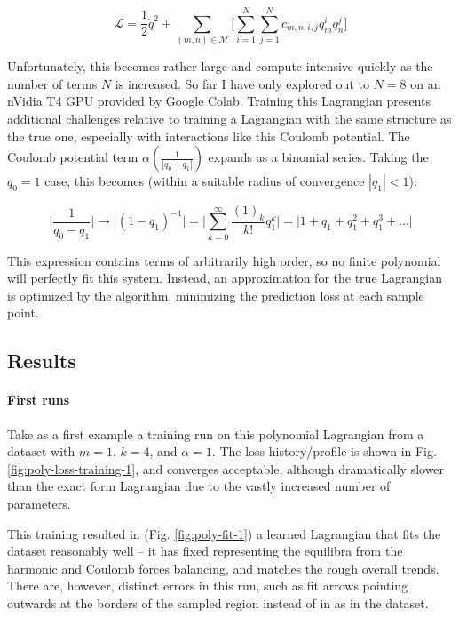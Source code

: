\documentclass[]{article}
\begin{document}
\begin{equation}
	\mathcal{L} = \frac{1}{2} \dot{q}^2 + \sum_{(m,n)\in\mathcal{M}}  \Bigg[\sum_{i=1}^{N} \sum_{j=1}^{N} c_{m,n,i,j} q_m^i q_n^j\Bigg]
\end{equation}

Unfortunately, this becomes rather large and compute-intensive quickly as the number of terms $N$ is increased. So far I have only explored out to $N=8$ on an nVidia T4 GPU provided by Google Colab. Training this Lagrangian presents additional challenges relative to training a Lagrangian with the same structure as the true one, especially with interactions like this Coulomb potential. The Coulomb potential term $\alpha(\frac{1}{|q_0-q_1|})$ expands as a binomial series\cite{Binomial}. Taking the $q_0=1$ case, this  becomes (within a suitable radius of convergence $|q_1|<1$):

\begin{equation}
	\Big|\frac{1}{q_0-q_1}\Big| \to \Big| (1-q_1)^{-1}\Big| = \Big|\sum_{k=0}^{\infty} \frac{(1)_k}{k!}q_1^k\Big| = \Big|1 + q_1 + q_1^2 + q_1^3 + ...\Big|
\end{equation}

This expression contains terms of arbitrarily high order, so no finite polynomial will perfectly fit this system. Instead, an approximation for the true Lagrangian is optimized by the algorithm, minimizing the prediction loss at each sample point.

\subsection{Results}
\paragraph{First runs}
Take as a first example a training run on this polynomial Lagrangian from a dataset with $m=1$, $k=4$, and $\alpha=1$. The loss history/profile is shown in Fig. \ref{fig:poly-loss-training-1}, and converges acceptable, although dramatically slower than the exact form Lagrangian due to the vastly increased number of parameters.

This training resulted in (Fig. \ref{fig:poly-fit-1}) a learned Lagrangian that fits the dataset reasonably well -- it has fixed representing the equilibra from the harmonic and Coulomb forces balancing, and matches the rough overall trends. There are, however, distinct errors in this run, such as fit arrows pointing outwards at the borders of the sampled region instead of in as in the dataset. 
\end{document}
